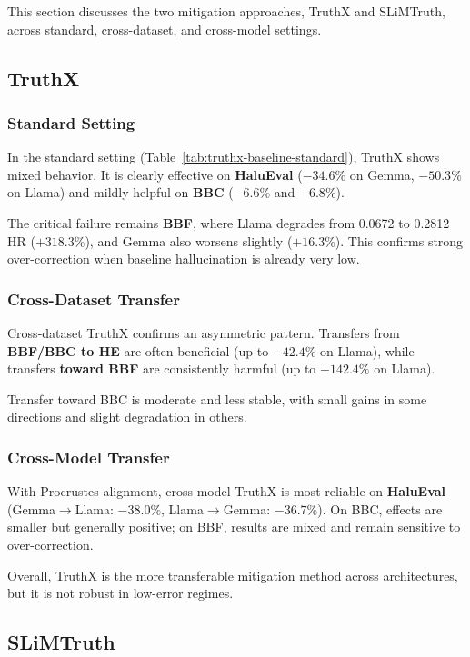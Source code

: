 This section discusses the two mitigation approaches, TruthX and SLiMTruth, across standard, cross-dataset, and cross-model settings.

\subsection{TruthX}

\subsubsection{Standard Setting}
In the standard setting (Table~\ref{tab:truthx-baseline-standard}), TruthX shows mixed behavior. It is clearly effective on \textbf{HaluEval} ($-34.6\%$ on Gemma, $-50.3\%$ on Llama) and mildly helpful on \textbf{BBC} ($-6.6\%$ and $-6.8\%$).

The critical failure remains \textbf{BBF}, where Llama degrades from 0.0672 to 0.2812 HR ($+318.3\%$), and Gemma also worsens slightly ($+16.3\%$). This confirms strong over-correction when baseline hallucination is already very low.

\subsubsection{Cross-Dataset Transfer}
Cross-dataset TruthX confirms an asymmetric pattern. Transfers from \textbf{BBF/BBC to HE} are often beneficial (up to $-42.4\%$ on Llama), while transfers \textbf{toward BBF} are consistently harmful (up to $+142.4\%$ on Llama).

Transfer toward BBC is moderate and less stable, with small gains in some directions and slight degradation in others.

\subsubsection{Cross-Model Transfer}
With Procrustes alignment, cross-model TruthX is most reliable on \textbf{HaluEval} (Gemma$\rightarrow$Llama: $-38.0\%$, Llama$\rightarrow$Gemma: $-36.7\%$). On BBC, effects are smaller but generally positive; on BBF, results are mixed and remain sensitive to over-correction.

Overall, TruthX is the more transferable mitigation method across architectures, but it is not robust in low-error regimes.

\subsection{SLiMTruth}

